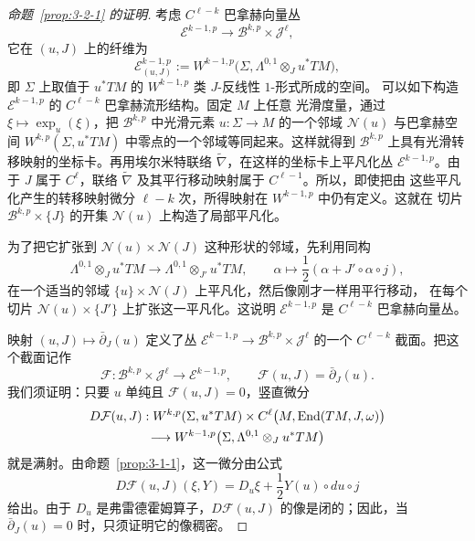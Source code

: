 \begin{proof}[命题~\ref{prop:3-2-1} 的证明]
考虑 $C^{\ell-k}$ 巴拿赫向量丛
\[
  \mathcal E^{k-1,p}\longrightarrow
  \mathcal B^{k,p}\times\mathcal J^\ell,
\]
它在 $(u,J)$ 上的纤维为
\[
  \mathcal E_{(u,J)}^{k-1,p}
  :=W^{k-1,p}\bigl(\Sigma,
  \Lambda^{0,1}\otimes_Ju^*TM\bigr),
\]
即 $\Sigma$ 上取值于 $u^*TM$ 的 $W^{k-1,p}$ 类 $J$-反线性 $1$-形式所成的空间。
可以如下构造 $\mathcal E^{k-1,p}$ 的 $C^{\ell-k}$ 巴拿赫流形结构。固定 $M$ 上任意
光滑度量，通过 $\xi\mapsto\exp_u(\xi)$，把 $\mathcal B^{k,p}$ 中光滑元素
$u:\Sigma\to M$ 的一个邻域 $\mathcal N(u)$ 与巴拿赫空间
$W^{k,p}(\Sigma,u^*TM)$ 中零点的一个邻域等同起来。这样就得到
$\mathcal B^{k,p}$ 上具有光滑转移映射的坐标卡。再用埃尔米特联络
$\widetilde\nabla$，在这样的坐标卡上平凡化丛 $\mathcal E^{k-1,p}$。由于 $J$ 属于
$C^\ell$，联络 $\widetilde\nabla$ 及其平行移动映射属于 $C^{\ell-1}$。所以，即使把由
这些平凡化产生的转移映射微分 $\ell-k$ 次，所得映射在 $W^{k-1,p}$ 中仍有定义。这就在
切片 $\mathcal B^{k,p}\times\{J\}$ 的开集 $\mathcal N(u)$ 上构造了局部平凡化。

为了把它扩张到 $\mathcal N(u)\times\mathcal N(J)$ 这种形状的邻域，先利用同构
\[
  \Lambda^{0,1}\otimes_Ju^*TM
  \longrightarrow
  \Lambda^{0,1}\otimes_{J'}u^*TM,
  \qquad
  \alpha\longmapsto\frac12(\alpha+J'\circ\alpha\circ j),
\]
在一个适当的邻域 $\{u\}\times\mathcal N(J)$ 上平凡化，然后像刚才一样用平行移动，
在每个切片 $\mathcal N(u)\times\{J'\}$ 上扩张这一平凡化。这说明
$\mathcal E^{k-1,p}$ 是 $C^{\ell-k}$ 巴拿赫向量丛。

映射 $(u,J)\mapsto\bar\partial_J(u)$ 定义了丛
$\mathcal E^{k-1,p}\to\mathcal B^{k,p}\times\mathcal J^\ell$ 的一个
$C^{\ell-k}$ 截面。把这个截面记作
\[
  \mathcal F:\mathcal B^{k,p}\times\mathcal J^\ell
  \longrightarrow\mathcal E^{k-1,p},
  \qquad
  \mathcal F(u,J)=\bar\partial_J(u).
\]
我们须证明：只要 $u$ 单纯且 $\mathcal F(u,J)=0$，竖直微分
\begin{multline*}
  D\mathcal F(u,J):
  W^{k,p}(\Sigma,u^*TM)
  \times C^\ell\bigl(M,\operatorname{End}(TM,J,\omega)\bigr)\\
  \longrightarrow
  W^{k-1,p}\bigl(\Sigma,
  \Lambda^{0,1}\otimes_Ju^*TM\bigr)
\end{multline*}
就是满射。由命题~\ref{prop:3-1-1}，这一微分由公式
\[
  D\mathcal F(u,J)(\xi,Y)
  =D_u\xi+\frac12Y(u)\circ du\circ j
\]
给出。由于 $D_u$ 是弗雷德霍姆算子，$D\mathcal F(u,J)$ 的像是闭的；因此，当
$\bar\partial_J(u)=0$ 时，只须证明它的像稠密。


\end{proof}
